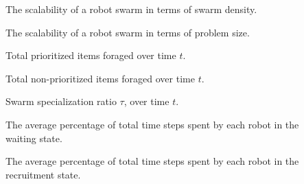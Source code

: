 \begin{description}
	\item[\parbox{\namewidth}{$S_c$}] The scalability of a robot swarm in terms of swarm density.	
	
	\item[\parbox{\namewidth}{$S_p$}] The scalability of a robot swarm in terms of problem size.	
	
	\item[\parbox{\namewidth}{$E^t_P$}] Total prioritized items foraged over time $t$.	

	\item[\parbox{\namewidth}{$E^t_{NP}$}] Total non-prioritized items foraged over time $t$.	
	
	\item[\parbox{\namewidth}{$\tau_t$}] Swarm specialization ratio $\tau$, over time $t$.	

	\item[\parbox{\namewidth}{$t_{wait}$}] The average percentage of total time steps spent by each robot in the waiting state.

	\item[\parbox{\namewidth}{$t_{recruitment}$}] The average percentage of total time steps spent by each robot in the recruitment state. 
	
	\item[\parbox{\namewidth}{$E_P$} The percentage of the total number of prioritized]
\end{description}
